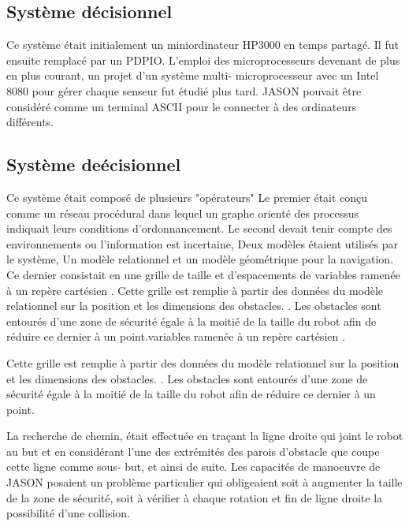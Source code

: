 \subsection{Système décisionnel}
Ce système était initialement un miniordinateur HP3000 en temps partagé. Il fut ensuite remplacé par un PDPIO. L'emploi des microprocesseurs devenant de plus en plus courant, un projet d'un système multi- microprocesseur avec un Intel 8080 pour gérer chaque senseur fut étudié plus tard.
JASON pouvait être considéré comme un terminal ASCII pour le connecter à des ordinateurs différents.
\subsection{Système deécisionnel}
Ce système était composé de plusieurs "opérateurs" 
Le premier était conçu comme un réseau procédural dans lequel un graphe orienté des processus indiquait leurs conditions d'ordonnancement. Le second devait tenir compte des environnements ou l'information est incertaine, Deux modèles étaient utilisés par le système, Un modèle relationnel  et un modèle géométrique pour la navigation. Ce dernier consistait en une grille de taille et d'espacements de variables ramenée à un repère cartésien . Cette grille est remplie à partir des données du modèle relationnel sur la position et les dimensions des obstacles. . 
Les obstacles sont entourés d'une zone de sécurité égale à la moitié de la taille du robot afin de réduire ce dernier à un point.variables ramenée à un repère cartésien . 

Cette grille est remplie à partir des données du modèle relationnel sur la position et les dimensions des obstacles. . Les obstacles sont entourés d'une zone de sécurité égale à la moitié de la taille du robot afin de réduire ce dernier à un point.

La recherche de chemin, était effectuée en traçant la ligne droite qui joint le robot au but et en considérant l'une des extrémités des parois d'obstacle que coupe cette ligne comme sous- but, et ainsi de suite. Les capacités de manoeuvre de JASON posaient un problème particulier qui obligeaient soit à augmenter la taille de la zone de sécurité, soit à vérifier à chaque rotation et fin de ligne droite la possibilité d'une collision.

 
